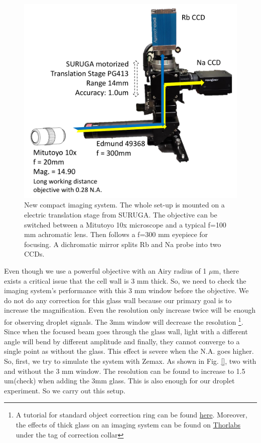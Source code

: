 \begin{figure}[htb]
\begin{center}
\includegraphics[width = 0.8\linewidth]{figures/image_system.pdf}
\end{center}
\caption[New compact imaging system]{New compact imaging system. The whole set-up is mounted on a electric translation stage from SURUGA. The objective can be switched between a Mitutoyo 10x microscope and a typical f=100 mm achromatic lens. Then follows a f=300 mm eyepiece for focusing. A dichromatic mirror splits Rb and Na probe into two CCDs.}
\label{image_system}
\end{figure}

Even though we use a powerful objective with an Airy radius of 1 $\mu$m, there exists a critical issue that the cell wall is 3 mm thick. So, we need to check the imaging system's performance with this 3 mm window before the objective. We do not do any correction for this glass wall because our primary goal is to increase the magnification. Even the resolution only increase twice will be enough for observing droplet signals. The 3mm window will decrease the resolution \footnote{A tutorial for standard object correction ring can be found \href{ http://www.mvi-inc.com/wp-content/uploads/Use-of-the-Correction-Ring-on-the-Objective.pdf}{here}. Moreover, the effects of thick glass on an imaging system can be found on \href{https://www.thorlabs.com/newgrouppage9.cfm?objectgroup_id=9895&pn=TL2X-SAP}{Thorlabs} under the tag of correction collar}. Since when the focused beam goes through the glass wall, light with a different angle will bend by different amplitude and finally, they cannot converge to a single point as without the glass. This effect is severe when the N.A. goes higher. So, first, we try to simulate the system with Zemax. As shown in Fig. \ref{}, two with and without the 3 mm window. The resolution can be found to increase to 1.5 um(check) when adding the 3mm glass. This is also enough for our droplet experiment. So we carry out this setup.

